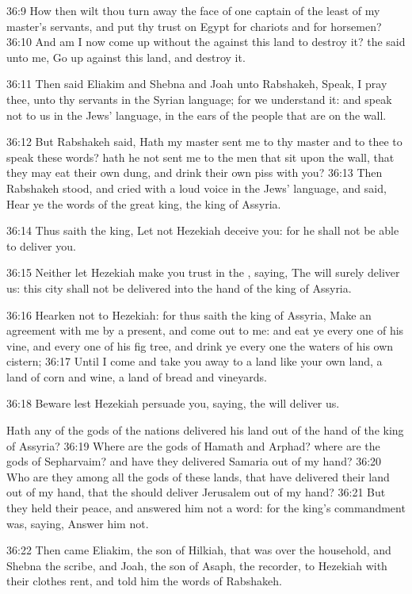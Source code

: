 36:9 How then wilt thou turn away the face of one captain of the least of my master's servants, and put thy trust on Egypt for chariots and for horsemen?  36:10 And am I now come up without the \LORD against this land to destroy it? the \LORD said unto me, Go up against this land, and destroy it.

36:11 Then said Eliakim and Shebna and Joah unto Rabshakeh, Speak, I pray thee, unto thy servants in the Syrian language; for we understand it: and speak not to us in the Jews' language, in the ears of the people that are on the wall.

36:12 But Rabshakeh said, Hath my master sent me to thy master and to thee to speak these words? hath he not sent me to the men that sit upon the wall, that they may eat their own dung, and drink their own piss with you?  36:13 Then Rabshakeh stood, and cried with a loud voice in the Jews' language, and said, Hear ye the words of the great king, the king of Assyria.

36:14 Thus saith the king, Let not Hezekiah deceive you: for he shall not be able to deliver you.

36:15 Neither let Hezekiah make you trust in the \LORD, saying, The \LORD will surely deliver us: this city shall not be delivered into the hand of the king of Assyria.

36:16 Hearken not to Hezekiah: for thus saith the king of Assyria, Make an agreement with me by a present, and come out to me: and eat ye every one of his vine, and every one of his fig tree, and drink ye every one the waters of his own cistern; 36:17 Until I come and take you away to a land like your own land, a land of corn and wine, a land of bread and vineyards.

36:18 Beware lest Hezekiah persuade you, saying, the \LORD will deliver us.

Hath any of the gods of the nations delivered his land out of the hand of the king of Assyria?  36:19 Where are the gods of Hamath and Arphad? where are the gods of Sepharvaim? and have they delivered Samaria out of my hand?  36:20 Who are they among all the gods of these lands, that have delivered their land out of my hand, that the \LORD should deliver Jerusalem out of my hand?  36:21 But they held their peace, and answered him not a word: for the king's commandment was, saying, Answer him not.

36:22 Then came Eliakim, the son of Hilkiah, that was over the household, and Shebna the scribe, and Joah, the son of Asaph, the recorder, to Hezekiah with their clothes rent, and told him the words of Rabshakeh.

